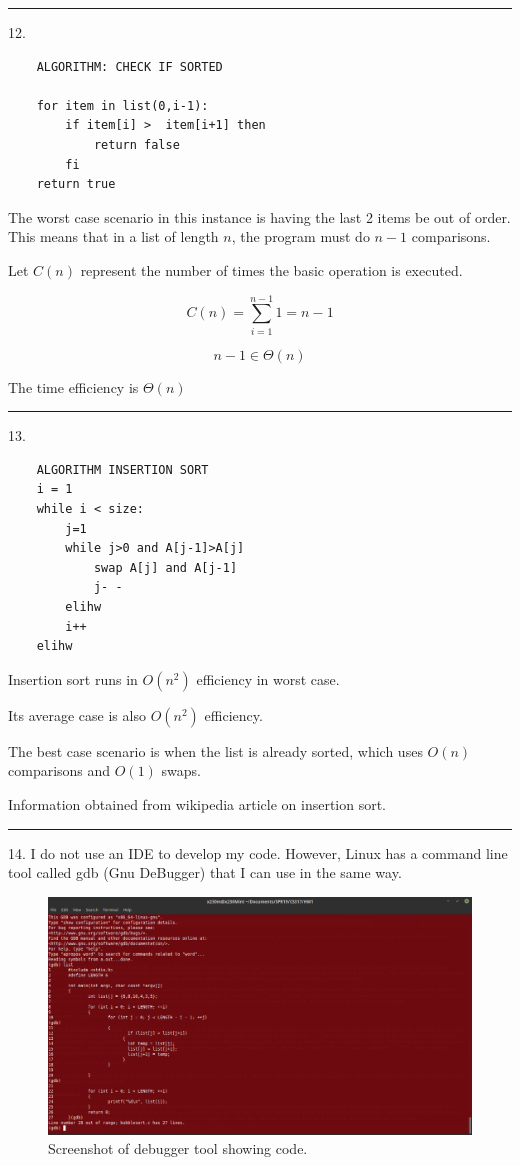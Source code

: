\documentclass{article}
\begin{document}
\noindent\rule{8cm}{0.4pt}


12. 

\begin{lstlisting}
	ALGORITHM: CHECK IF SORTED

	for item in list(0,i-1):
		if item[i] >  item[i+1] then
			return false
		fi
	return true
\end{lstlisting}

The worst case scenario in this instance is having the last 2 items be out of order. This means that in a list of length $n$, the program must do $n-1$ comparisons. 

Let $C(n)$ represent the number of times the basic operation is executed. 

\[ C(n) = \sum_{i=1}^{n-1} 1 = n-1 \]


\[ n-1 \in \Theta(n)  \]

The time efficiency is $\Theta(n)$


\noindent\rule{8cm}{0.4pt}



13. 

\begin{lstlisting}
	ALGORITHM INSERTION SORT
	i = 1
	while i < size:
		j=1
		while j>0 and A[j-1]>A[j]
			swap A[j] and A[j-1]
			j- - 
		elihw
		i++
	elihw
\end{lstlisting}

Insertion sort runs in $O(n^2)$ efficiency in worst case. 

Its average case is also $O(n^2)$ efficiency. 

The best case scenario is when the list is already sorted, which uses $O(n)$ comparisons and $O(1)$ swaps. 

Information obtained from wikipedia article on insertion sort. 

\noindent\rule{8cm}{0.4pt}


14. I do not use an IDE to develop my code. However, Linux has a command line tool called gdb (Gnu DeBugger) that I can use in the same way. 


\begin{figure}[H]

  \includegraphics[scale=0.4]{P15-1}
  \caption{Screenshot of debugger tool showing code.}
\end{figure}
\end{document}
